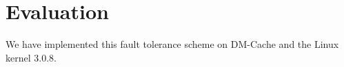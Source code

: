 \section{Evaluation}
\label{sec:evaluation}

We have implemented this fault tolerance scheme on DM-Cache and the
Linux kernel 3.0.8.
